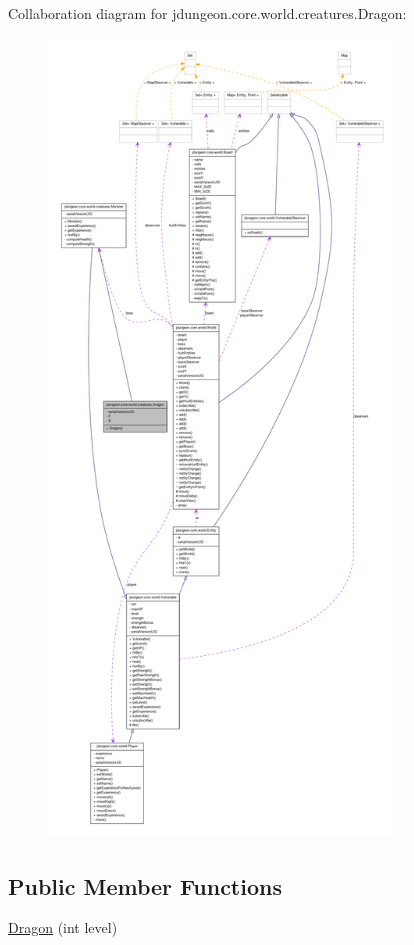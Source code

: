 Collaboration diagram for jdungeon.core.world.creatures.Dragon:
\nopagebreak
\begin{figure}[H]
\begin{center}
\leavevmode
\includegraphics[height=600pt]{classjdungeon_1_1core_1_1world_1_1creatures_1_1_dragon__coll__graph}
\end{center}
\end{figure}
\subsection*{Public Member Functions}
\begin{DoxyCompactItemize}
\item 
\hyperlink{classjdungeon_1_1core_1_1world_1_1creatures_1_1_dragon_ac2227fcf1fde56f8bb8b50115f789ed7}{Dragon} (int level)
\end{DoxyCompactItemize}


